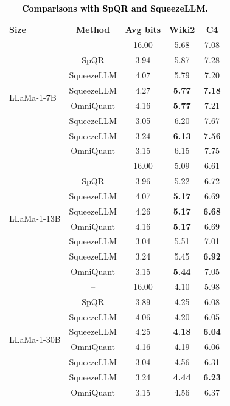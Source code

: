 \documentclass{article} %
\begin{document}
\begin{table}[!ht]
    \centering
    \caption{\textcolor{black}{\textbf{Comparisons with SpQR and SqueezeLLM.}}}
\color{black}
\begin{tabular}{lcccc}
 \toprule
 \bf{Size} & \bf{Method} & \bf{Avg bits} & \bf{Wiki2} & \bf{C4} \\
 \midrule
 \multirow{8}{*}{LLaMa-1-7B} & -- & 16.00 & 5.68 & 7.08 \\
 & SpQR & 3.94 & 5.87 & 7.28\\
 & SqueezeLLM & 4.07 & 5.79 & 7.20 \\
 & SqueezeLLM & 4.27 & \textbf{5.77} & \textbf{7.18} \\
 & OmniQuant & 4.16 & \textbf{5.77} & 7.21 \\
 \cmidrule{2-5}
 & SqueezeLLM & 3.05 & 6.20 & 7.67 \\
 & SqueezeLLM & 3.24 & \textbf{6.13} & \textbf{7.56} \\
 & OmniQuant & 3.15 & 6.15 & 7.75 \\
 \midrule
 \multirow{8}{*}{LLaMa-1-13B} & -- & 16.00 & 5.09 & 6.61 \\
 & SpQR & 3.96 & 5.22 & 6.72 \\
 & SqueezeLLM & 4.07 & \textbf{5.17} & 6.69 \\
 & SqueezeLLM & 4.26 & \textbf{5.17} & \textbf{6.68} \\
 & OmniQuant & 4.16 & \textbf{5.17} & 6.69 \\
 \cmidrule{2-5}
 & SqueezeLLM & 3.04 & 5.51 & 7.01 \\
 & SqueezeLLM & 3.24 & 5.45 & \textbf{6.92} \\
 & OmniQuant & 3.15 & \textbf{5.44} & 7.05 \\
 \hline
 \multirow{8}{*}{LLaMa-1-30B} & -- & 16.00 & 4.10 & 5.98 \\
 & SpQR & 3.89 & 4.25 & 6.08 \\
 & SqueezeLLM & 4.06 & 4.20 & 6.05 \\
 & SqueezeLLM & 4.25 & \textbf{4.18} & \textbf{6.04} \\
 & OmniQuant & 4.16 & 4.19 & 6.06 \\
 \cmidrule{2-5}
 & SqueezeLLM & 3.04 & 4.56 & 6.31 \\
 & SqueezeLLM & 3.24 & \textbf{4.44} & \textbf{6.23} \\
 & OmniQuant & 3.15 & 4.56 & 6.37 \\
 \bottomrule
 \end{tabular}
    \label{tab:comparisons-with-mix}
\end{table}
\end{document}
